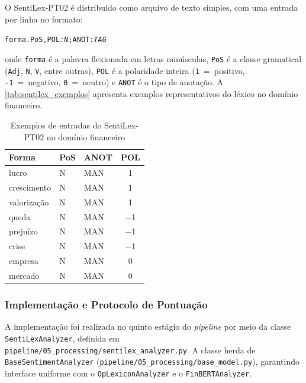 O SentiLex-PT02 é distribuído como arquivo de texto simples, com uma entrada por linha no formato:

\begin{center}
	\texttt{forma.PoS,POL:\textit{N};ANOT:\textit{TAG}}
\end{center}

\noindent onde \texttt{forma} é a palavra flexionada em letras minúsculas, \texttt{PoS} é a classe gramatical (\texttt{Adj}, \texttt{N}, \texttt{V}, entre outras), \texttt{POL} é a polaridade inteira (\texttt{1}~=~positivo, \texttt{-1}~=~negativo, \texttt{0}~=~neutro) e \texttt{ANOT} é o tipo de anotação. A \autoref{tab:sentilex_exemplos} apresenta exemplos representativos do léxico no domínio financeiro.

\begin{table}[!htbp]
	\caption{Exemplos de entradas do SentiLex-PT02 no domínio financeiro}
	\label{tab:sentilex_exemplos}
	\centering
	\begin{tabular}{lllc}
		\hline
		\textbf{Forma} & \textbf{PoS} & \textbf{ANOT} & \textbf{POL} \\
		\hline
		lucro      & N   & MAN & \phantom{$-$}1 \\
		crescimento & N  & MAN & \phantom{$-$}1 \\
		valorização & N  & MAN & \phantom{$-$}1 \\
		queda      & N   & MAN & $-$1 \\
		prejuízo   & N   & MAN & $-$1 \\
		crise      & N   & MAN & $-$1 \\
		empresa    & N   & MAN & \phantom{$-$}0 \\
		mercado    & N   & MAN & \phantom{$-$}0 \\
		\hline
	\end{tabular}
\end{table}

\subsubsection{Implementação e Protocolo de Pontuação}
\label{subsubsec:protocolo_sentilex}

A implementação foi realizada no quinto estágio do \textit{pipeline} por meio da classe \texttt{SentiLexAnalyzer}, definida em \texttt{pipeline/05\_processing/sentilex\_analyzer.py}. A classe herda de \texttt{BaseSentimentAnalyzer} (\texttt{pipeline/05\_processing/base\_model.py}), garantindo interface uniforme com o \texttt{OpLexiconAnalyzer} e o \texttt{FinBERTAnalyzer}.


